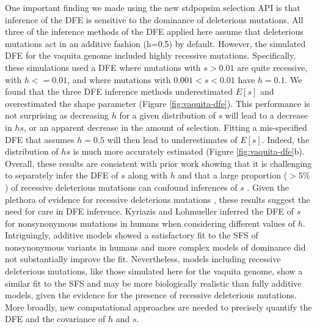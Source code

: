 \documentclass[hidelinks]{article}
\begin{document}
    One important finding we made using the new stdpopsim selection API is that inference of the DFE is sensitive to the dominance of deleterious mutations.
    All three of the inference methods of the DFE applied here assume that deleterious mutations act in an additive fashion (h=0.5) by default.
    However, the simulated DFE for the vaquita genome included highly recessive mutations.
    Specifically, these simulations used a DFE where mutations with $s>0.01$ are quite recessive, 
    with $h<=0.01$, and where mutations with $0.001<s<0.01$ have $h=0.1$.
    We found that the three DFE inference methods underestimated $E[s]$ and overestimated the shape parameter (Figure \ref{fig:vaquita-dfe}).
    This performance is not surprising as decreasing $h$ for a given distribution of $s$ will lead to a decrease in $hs$,
    or an apparent decrease in the amount of selection.
    Fitting a mis-specified DFE that assumes $h=0.5$ will then lead to underestimates of $E[s]$.
    Indeed, the distribution of $hs$ is much more accurately estimated (Figure \ref{fig:vaquita-dfe}b).
    Overall, these results are consistent with prior work showing that it is challenging to separately
    infer the DFE of $s$ along with $h$ \citep{veeramah2014evidence, kyriazis2024constraining, balick2022overcoming}
    and that a large proportion ($>5\%$) of recessive deleterious mutations can confound inferences of $s$ \citep{wade2023quantifying}.
    Given the plethora of evidence for recessive deleterious mutations 
    \citep{mukai1972mutation, agrawal2011inferences, huber2018gene, di2024revisiting,},
    these results suggest the need for care in DFE inference.
    Kyriazis and Lohmueller \citeyear{kyriazis2024constraining} inferred the DFE of $s$ for nonsynonymous mutations
    in humans when considering different values of $h$.
    Intriguingly, additive models showed a satisfactory fit to the SFS of nonsynonymous variants in humans
    and more complex models of dominance did not substantially improve the fit.
    Nevertheless, models including recessive deleterious mutations, like those simulated here for the vaquita genome,
    show a similar fit to the SFS and may be more biologically realistic than fully additive models,
    given the evidence for the presence of recessive deleterious mutations.
    More broadly, new computational approaches are needed to precisely quantify the DFE and the covariance of $h$ and $s$.
\end{document}
